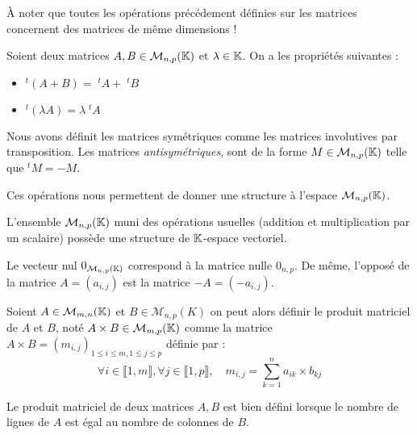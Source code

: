 \begin{remark}
    À noter que toutes les opérations précédement définies sur les matrices concernent des matrices 
    de même dimensions ! 
\end{remark}

\begin{prop}
    Soient deux matrices $A,B \in \mathcal{M}_{n,p}(\mathbb{K})$ et $ \lambda \in \mathbb{K}$. On a les propriétés suivantes : 
    \begin{itemize}
        \item $^t(A + B) = \; ^tA + \; ^tB $
        \item $^t(\lambda A) = \lambda \; ^t A $ 
    \end{itemize}
\end{prop}

\begin{definition}
    Nous avons définit les matrices symétriques comme les matrices involutives par transposition. 
    Les matrices \emph{antisymétriques}, sont de la forme $M \in \mathcal{M}_{n,p}(\mathbb{K})$ telle que $^tM = - M$. 
\end{definition}

Ces opérations nous permettent de donner une structure à l'espace $ \mathcal{M}_{n,p}(\mathbb{K})$. 

\begin{prop}[Structure]
    L'ensemble $\mathcal{M}_{n,p}(\mathbb{K})$ muni des opérations usuelles (addition et multiplication par un scalaire) 
    possède une structure de $\mathbb{K}$-espace vectoriel. 
    
    Le vecteur nul $0_{\mathcal{M}_{n,p}(\mathbb{K})}$ correspond à la matrice nulle $0_{n,p}$. 
    De même, l'opposé de la matrice $A = (a_{i,j})$ est la matrice $-A = (-a_{i,j})$. 
\end{prop}

\begin{definition}
    Soient $A \in \mathcal{M}_{m,n}(\mathbb{K})$ et $ B \in \mathcal{M}_{n,p}(K)$ on peut alors définir 
    le produit matriciel de $A$ et $B$, noté $A \times B \in \mathcal{M}_{m,p}(\mathbb{K})$ comme 
    la matrice $ A \times B = (m_{i,j})_{1 \leqslant i \leqslant m, 1 \leqslant j \leqslant p}$ définie par : 
        \[ 
            \forall i \in \llbracket 1, m \rrbracket , \forall j \in \llbracket 1, p \rrbracket,
            \quad m_{i,j} = \sum_{k=1}^{n} a_{ik} \times b_{kj} 
        \] 
\end{definition}

\begin{remark}
    Le produit matriciel de deux matrices $A,B$ est bien défini lorsque le nombre de lignes de $A$ 
    est égal au nombre de colonnes de $B$. 
\end{remark}

